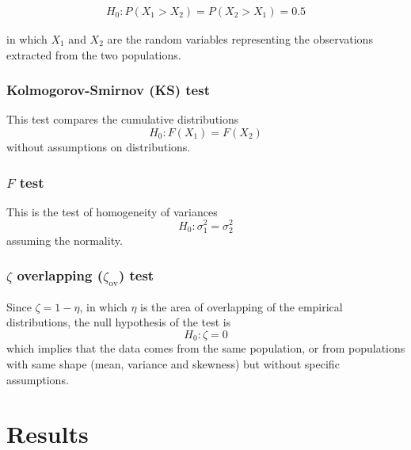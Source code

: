 \documentclass[twocolumn]{article}\usepackage[]{graphicx}\usepackage[]{xcolor}
\begin{document}
\begin{eqnarray*}
H_0: P(X_1 > X_2) = P(X_2 > X_1) = 0.5
\end{eqnarray*} 

in which $X_1$ and $X_2$ are the random variables representing the observations extracted from the two populations. %

\subsubsection{Kolmogorov-Smirnov (KS) test}

This test compares the cumulative distributions $$H_0: F(X_1) = F(X_2)$$ without assumptions on distributions. %

\subsubsection{$F$ test}

This is the test of homogeneity of variances $$H_0: \sigma^2_1 = \sigma^2_2$$ assuming the normality. %

\subsubsection{ $\zeta$  overlapping ($\zeta_{\mbox{ov}}$) test}

Since $\zeta = 1 - \eta$, in which $\eta$ is the area of overlapping of the empirical distributions, the null hypothesis of the test is $$H_0: \zeta = 0$$ which implies that the data comes from the same population, or from populations with same shape (mean, variance and skewness) but without specific assumptions. %


\section{Results}
\end{document}

